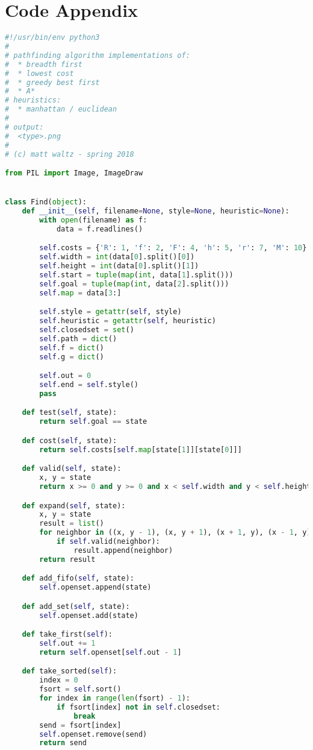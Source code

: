 \documentclass[11pt,letterpaper]{article}
\begin{document}
\section{Code Appendix}
\begin{lstlisting}[language=Python]
#!/usr/bin/env python3
#
# pathfinding algorithm implementations of:
#  * breadth first
#  * lowest cost
#  * greedy best first
#  * A*
# heuristics:
#  * manhattan / euclidean
#
# output:
#  <type>.png
#
# (c) matt waltz - spring 2018

from PIL import Image, ImageDraw


class Find(object):
    def __init__(self, filename=None, style=None, heuristic=None):
        with open(filename) as f:
            data = f.readlines()

        self.costs = {'R': 1, 'f': 2, 'F': 4, 'h': 5, 'r': 7, 'M': 10}
        self.width = int(data[0].split()[0])
        self.height = int(data[0].split()[1])
        self.start = tuple(map(int, data[1].split()))
        self.goal = tuple(map(int, data[2].split()))
        self.map = data[3:]

        self.style = getattr(self, style)
        self.heuristic = getattr(self, heuristic)
        self.closedset = set()
        self.path = dict()
        self.f = dict()
        self.g = dict()

        self.out = 0
        self.end = self.style()
        pass

    def test(self, state):
        return self.goal == state

    def cost(self, state):
        return self.costs[self.map[state[1]][state[0]]]

    def valid(self, state):
        x, y = state
        return x >= 0 and y >= 0 and x < self.width and y < self.height and self.map[y][x] != 'W'

    def expand(self, state):
        x, y = state
        result = list()
        for neighbor in ((x, y - 1), (x, y + 1), (x + 1, y), (x - 1, y)):
            if self.valid(neighbor):
                result.append(neighbor)
        return result

    def add_fifo(self, state):
        self.openset.append(state)

    def add_set(self, state):
        self.openset.add(state)

    def take_first(self):
        self.out += 1
        return self.openset[self.out - 1]

    def take_sorted(self):
        index = 0
        fsort = self.sort()
        for index in range(len(fsort) - 1):
            if fsort[index] not in self.closedset:
                break
        send = fsort[index]
        self.openset.remove(send)
        return send


\end{lstlisting}
\end{document}
